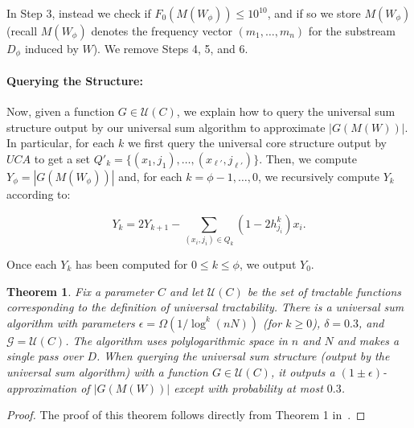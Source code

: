 \documentclass[11pt]{article}
\newtheorem{thm}{Theorem}
\begin{document}
In Step 3, instead we check if $F_0(M(W_\phi)) \leq 10^{10}$, and if so we store $M(W_\phi)$ (recall $M(W_\phi)$
denotes the frequency vector $(m_1,\ldots,m_n)$ for the substream $D_\phi$ induced by $W$).  We remove Steps
4, 5, and 6.

\paragraph{Querying the Structure:} Now, given a function $G \in \mathcal{U}(C)$, we explain how to query
the universal sum structure output by our universal sum algorithm to approximate $|G(M(W))|$.  In particular, for each $k$ we first
query the universal core structure output by $UCA$ to get a set $Q'_k = \{(x_1,j_1),\ldots,(x_{\ell'},j_{\ell'})\}$.
Then, we compute $Y_\phi = |G(M(W_\phi))|$ and, for each $k = \phi - 1,\ldots,0$, we recursively compute
$Y_k$ according to:

$$Y_k = 2Y_{k+1} - \sum_{(x_i, j_i) \in Q_k} (1-2h_{j_i}^k)x_i.$$

\noindent Once each $Y_k$ has been computed for $0 \leq k \leq \phi$, we output $Y_0$.

\begin{thm}
Fix a parameter $C$ and let $\mathcal{U}(C)$ be the set of tractable functions corresponding to the
definition of universal tractability.  There is a universal sum algorithm with parameters
$\epsilon = \Omega(1/\log^k(nN))$ (for $k \geq 0$), $\delta = 0.3$,
and $\mathcal{G} = \mathcal{U}(C)$.  The algorithm uses polylogarithmic space in $n$ and $N$ and makes a single
pass over $D$.  When querying the universal sum structure (output by the universal sum algorithm)
with a function $G \in \mathcal{U}(C)$, it outputs a $(1 \pm \epsilon)$-approximation of $|G(M(W))|$ except
with probability at most $0.3$.
\end{thm}

\begin{proof}
The proof of this theorem follows directly from Theorem 1 in~\cite{BO13}.
\end{proof}
\end{document}
